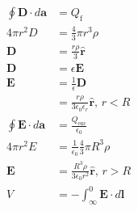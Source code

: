 \documentclass{article}
\renewcommand{\vec}[1]{\boldsymbol{\mathbf{#1}}}
\newcommand{\uvec}[1]{\hat{\vec{#1}}}
\begin{document}
\subsection{}

\begin{align*}
  \oint \vec{D} \cdot d \vec{a} & = Q_\text{f}                                                                                                                                                   \\
  4 \pi r^2 D                   & = \frac{4}{3} \pi r^3 \rho                                                                                                                                     \\
  \vec{D}                       & = \frac{r \rho}{3} \uvec{r}                                                                                                                                    \\
  \vec{D}                       & = \epsilon \vec{E}                                                                                                                                             \\
  \vec{E}                       & = \frac{1}{\epsilon} \vec{D}                                                                                                                                   \\
                                & = \frac{r \rho}{3 \epsilon_0 \epsilon_r} \uvec{r}, \,r < R                                                                                                     \\
  \oint \vec{E} \cdot d \vec{a} & = \frac{Q_\text{enc}}{\epsilon_0}                                                                                                                              \\
  4 \pi r^2 E                   & = \frac{1}{\epsilon_0} \frac{4}{3} \pi R^3 \rho                                                                                                                \\
  \vec{E}                       & = \frac{R^3 \rho}{3 \epsilon_0 r^2} \uvec{r}, \,r > R                                                                                                          \\
  V                             & = -\int_\infty^0 \vec{E} \cdot d \vec{l}                                                                                                                       \\

\end{align*}
\end{document}
